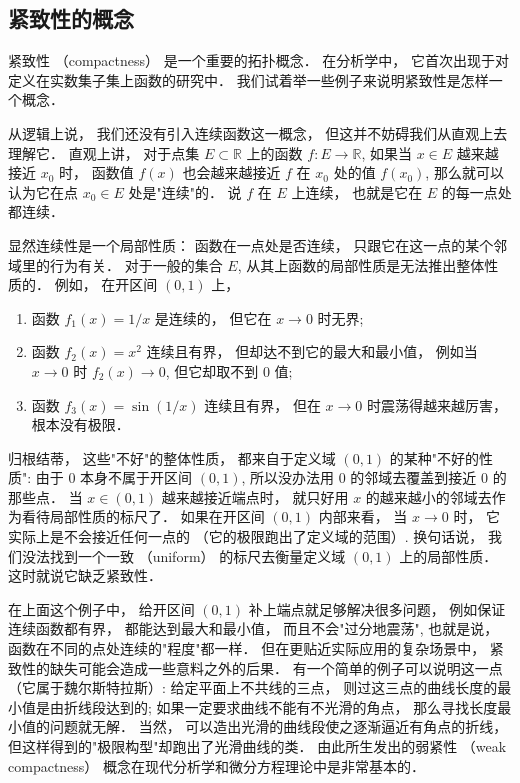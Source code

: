 


\subsection{紧致性的概念}
紧致性 （compactness） 是一个重要的拓扑概念． 在分析学中， 它首次出现于对定义在实数集子集上函数的研究中． 我们试着举一些例子来说明紧致性是怎样一个概念．

从逻辑上说， 我们还没有引入连续函数这一概念， 但这并不妨碍我们从直观上去理解它． 直观上讲， 对于点集 $E\subset\mathbb{R}$ 上的函数 $f:E\to\mathbb{R}$, 如果当 $x\in E$ 越来越接近 $x_0$ 时， 函数值 $f(x)$ 也会越来越接近 $f$ 在 $x_0$ 处的值 $f(x_0)$, 那么就可以认为它在点 $x_0\in E$ 处是"连续"的． 说 $f$ 在 $E$ 上连续， 也就是它在 $E$ 的每一点处都连续． 

显然连续性是一个局部性质： 函数在一点处是否连续， 只跟它在这一点的某个邻域里的行为有关． 对于一般的集合 $E$, 从其上函数的局部性质是无法推出整体性质的． 例如， 在开区间 $(0,1)$ 上，

\begin{enumerate}
\item 函数 $f_1(x)=1/x$ 是连续的， 但它在 $x\to0$ 时无界; 
\item 函数 $f_2(x)=x^2$ 连续且有界， 但却达不到它的最大和最小值， 例如当 $x\to0$ 时 $f_2(x)\to0$, 但它却取不到 $0$ 值; 
\item 函数 $f_3(x)=\sin(1/x)$ 连续且有界， 但在 $x\to0$ 时震荡得越来越厉害， 根本没有极限． 
\end{enumerate}

归根结蒂， 这些"不好"的整体性质， 都来自于定义域 $(0,1)$ 的某种"不好的性质": 由于 $0$ 本身不属于开区间 $(0,1)$, 所以没办法用 $0$ 的邻域去覆盖到接近 $0$ 的那些点． 当 $x\in(0,1)$ 越来越接近端点时， 就只好用 $x$ 的越来越小的邻域去作为看待局部性质的标尺了． 如果在开区间 $(0,1)$ 内部来看， 当 $x\to0$ 时， 它实际上是不会接近任何一点的 （它的极限跑出了定义域的范围）. 换句话说， 我们没法找到一个一致 （uniform） 的标尺去衡量定义域 $(0,1)$ 上的局部性质． 这时就说它缺乏紧致性． 

在上面这个例子中， 给开区间 $(0,1)$ 补上端点就足够解决很多问题， 例如保证连续函数都有界， 都能达到最大和最小值， 而且不会"过分地震荡", 也就是说， 函数在不同的点处连续的"程度"都一样． 但在更贴近实际应用的复杂场景中， 紧致性的缺失可能会造成一些意料之外的后果． 有一个简单的例子可以说明这一点 （它属于魏尔斯特拉斯）: 给定平面上不共线的三点， 则过这三点的曲线长度的最小值是由折线段达到的; 如果一定要求曲线不能有不光滑的角点， 那么寻找长度最小值的问题就无解． 当然， 可以造出光滑的曲线段使之逐渐逼近有角点的折线， 但这样得到的"极限构型"却跑出了光滑曲线的类． 由此所生发出的弱紧性 （weak compactness） 概念在现代分析学和微分方程理论中是非常基本的．

